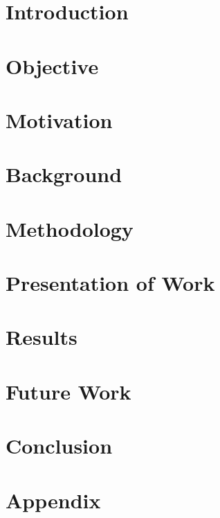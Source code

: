 \documentclass[12pt, letterpaper]{report}
\begin{document}




\chapter*{Introduction}


\chapter*{Objective}


\chapter*{Motivation}


\chapter*{Background}


\chapter*{Methodology}


\chapter*{Presentation of Work}


\chapter*{Results}


\chapter*{Future Work}


\chapter*{Conclusion}


\printbibliography

\chapter*{Appendix}

\end{document}
